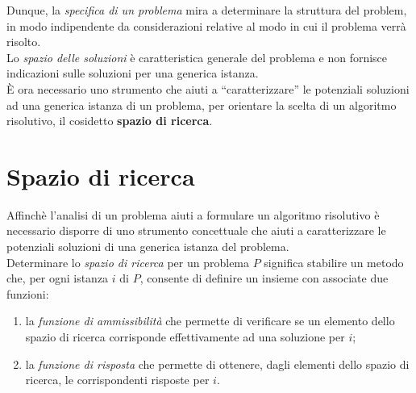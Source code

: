 \documentclass[12pt]{report}
\begin{document}
   	Dunque, la \textit{specifica di un problema} mira a determinare la struttura del problem, in modo indipendente da considerazioni relative al modo in cui il problema verrà risolto. \\
   	Lo \textit{spazio delle soluzioni} è caratteristica generale del problema e non fornisce indicazioni sulle soluzioni per una generica istanza. \\
   	È ora necessario uno strumento che aiuti a ``caratterizzare'' le potenziali soluzioni ad una generica istanza di un problema, per orientare la scelta di un algoritmo risolutivo, il cosidetto \textbf{spazio di ricerca}.
   	\section{Spazio di ricerca}
   	Affinchè l'analisi di un problema aiuti a formulare un algoritmo risolutivo è necessario disporre di uno strumento concettuale che aiuti a caratterizzare le potenziali soluzioni di una generica istanza del problema. \\
   	Determinare lo \textit{spazio di ricerca} per un problema $P$ significa stabilire un metodo che, per ogni istanza $i$ di $P$, consente di definire un insieme con associate due funzioni:
   	\begin{enumerate}
   		\item la \textit{funzione di ammissibilità} che permette di verificare se un elemento dello spazio di ricerca corrisponde effettivamente ad una soluzione per $i$;
   		\item la \textit{funzione di risposta} che permette di ottenere, dagli elementi dello spazio di ricerca, le corrispondenti risposte per $i$.
   	\end{enumerate}
\end{document}
